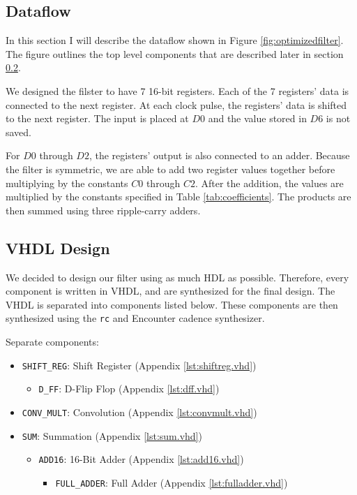 
\subsection{Dataflow}
In this section I will describe the dataflow shown in Figure \ref{fig:optimizedfilter}.  The figure outlines the top level components that are described later in section \ref{sec:vhdldesign}.  

We designed the filster to have 7 16-bit registers.  Each of the 7 registers' data is connected to the next register.  At each clock pulse, the registers' data is shifted to the next register. The input is placed at $D0$ and the value stored in $D6$ is not saved.

For $D0$ through $D2$, the registers' output is also connected to an adder.  Because the filter is symmetric, we are able to add two register values together before multiplying by the constants $C0$ through $C2$.  After the addition, the values are multiplied by the constants specified in Table \ref{tab:coefficients}.  The products are then summed using three ripple-carry adders.


\subsection{VHDL Design}
\label{sec:vhdldesign}
We decided to design our filter using as much HDL as possible.  Therefore, every component is written in VHDL, and are synthesized for the final design. The VHDL is separated into components listed below.  These components are then synthesized using the \texttt{rc} and Encounter cadence synthesizer.  

Separate components:
\begin{itemize}
\item \verb=SHIFT_REG=: Shift Register (Appendix \ref{lst:shiftreg.vhd})
	\begin{itemize}
		\item \verb=D_FF=: D-Flip Flop (Appendix \ref{lst:dff.vhd})
	\end{itemize}
\item \verb=CONV_MULT=: Convolution (Appendix \ref{lst:convmult.vhd})
\item \verb=SUM=: Summation (Appendix \ref{lst:sum.vhd})
	\begin{itemize}
		\item \verb=ADD16=: 16-Bit Adder (Appendix \ref{lst:add16.vhd})
		\begin{itemize}
			\item \verb=FULL_ADDER=: Full Adder (Appendix \ref{lst:fulladder.vhd})
		\end{itemize}
	\end{itemize}
\end{itemize}

